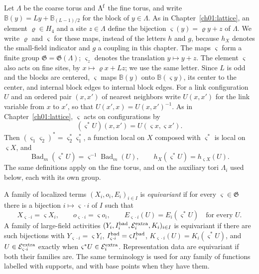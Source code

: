 Let $\Lambda$ be the coarse torus and $\Lambda^{\rm f}$ the fine torus,
and write $\mathbb B(y)=Ly+\mathbb B_{(L-1)/2}$ for the block of
$y\in\Lambda$. As in Chapter~\ref{ch01:lattice}, an element
$\varrho\in H_4$ and a site $z\in\Lambda$ define the bijection
$\varsigma(y)=\varrho y+z$ of $\Lambda$. We write $\varrho$ and
$\varsigma$ for these maps, instead of the letters $h$ and $g$, because
$h_X$ denotes the small-field indicator and $g$ a coupling in this
chapter. The maps $\varsigma$ form a finite group
$\mathfrak G=\mathfrak G(\Lambda)$; $\varsigma_z$ denotes the
translation $y\mapsto y+z$. The element $\varsigma$ also acts on fine
sites, by $x\mapsto\varrho x+Lz$; we use the same letter. Since $L$ is
odd and the blocks are centered, $\varsigma$ maps $\mathbb B(y)$ onto
$\mathbb B(\varsigma y)$, its center to the center, and internal block
edges to internal block edges. For a link configuration $U$ and an
ordered pair $(x,x')$ of nearest neighbors write $U(x,x')$ for the link
variable from $x$ to $x'$, so that $U(x',x)=U(x,x')^{-1}$. As in
Chapter~\ref{ch01:lattice}, $\varsigma$ acts on configurations by
\[
 (\varsigma^*U)(x,x')=U(\varsigma x,\varsigma x').
\]
Then $(\varsigma_1\varsigma_2)^*=\varsigma_2^*\varsigma_1^*$, a
function local on $X$ composed with $\varsigma^*$ is local on
$\varsigma X$, and
\begin{equation}
 \operatorname{Bad}_m(\varsigma^*U)
     =\varsigma^{-1}\operatorname{Bad}_m(U),
 \qquad h_X(\varsigma^*U)=h_{\varsigma X}(U).
 \label{ch09:bad-transport}
\end{equation}
The same definitions apply on the fine torus, and on the auxiliary tori
$\Lambda_i$ used below, each with its own group.

\begin{definition}
\label{ch09:equivariant}
A family of localized terms $(X_i,o_i,E_i)_{i\in I}$ is
\emph{equivariant} if for every $\varsigma\in\mathfrak G$ there is a
bijection $i\mapsto\varsigma\cdot i$ of $I$ such that
\[
 X_{\varsigma\cdot i}=\varsigma X_i,\qquad
 o_{\varsigma\cdot i}=\varsigma o_i,\qquad
 E_{\varsigma\cdot i}(U)=E_i(\varsigma^*U)\quad\text{for every }U .
\]
A family of large-field activities
$(Y_i,I_i^{\rm bad},\mathcal E_i^{\rm extra},K_i)_{i\in I}$ is
equivariant if there are such bijections with
$Y_{\varsigma\cdot i}=\varsigma Y_i$,
$I^{\rm bad}_{\varsigma\cdot i}=\varsigma I^{\rm bad}_i$,
$K_{\varsigma\cdot i}(U)=K_i(\varsigma^*U)$, and
$U\in\mathcal E^{\rm extra}_{\varsigma\cdot i}$ exactly when
$\varsigma^*U\in\mathcal E^{\rm extra}_i$. Representation data
are equivariant if both their families are. The same terminology is used
for any family of functions labelled with supports, and with base points
when they have them.
\end{definition}

